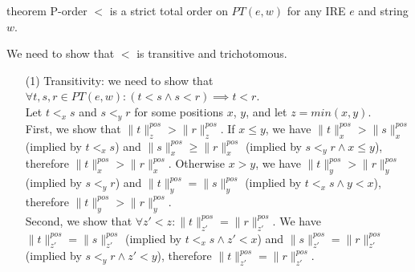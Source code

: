 \documentclass[AMA,STIX1COL]{WileyNJD-v2}
\newcommand{\PT}{PT}
\newcommand{\pnorm}[2]{\|{#1}\|^{pos}_{#2}}
\begin{document}
\begin{theoremEnd}[restate, no link to proof, no link to theorem, category=theorem_porder_on_PTs]{theorem}
    \label{theorem_porder_on_PTs}
    P-order $<$ is a strict total order on $\PT(e, w)$ for any IRE $e$ and string $w$.
\end{theoremEnd}
\begin{proofEnd}
    We need to show that $<$ is transitive and trichotomous.
    \begin{itemize}[itemsep=0.3em, topsep=0.5em]
        \item[(1)]
            Transitivity: we need to show that $\forall t, s, r \in \PT(e, w): (t < s \wedge s < r) \implies t < r$.
            \\[0.5em]
            Let $t <_x s$ and $s <_y r$ for some positions $x$, $y$, and let $z = min (x, y)$.
            \\[0.5em]
            First, we show that $\pnorm{t}{z} > \pnorm{r}{z}$.
            If $x \leq y$, we have $\pnorm{t}{x} > \pnorm{s}{x}$ (implied by $t <_x s$)
            and $\pnorm{s}{x} \geq \pnorm{r}{x}$ (implied by $s <_y r \wedge x \leq y$),
            therefore $\pnorm{t}{x} > \pnorm{r}{x}$.
            Otherwise $x > y$, we have $\pnorm{t}{y} > \pnorm{r}{y}$ (implied by $s <_y r$)
            and $\pnorm{t}{y} = \pnorm{s}{y}$ (implied by $t <_x s \wedge y < x$),
            therefore $\pnorm{t}{y} > \pnorm{r}{y}$.
            \\[0.5em]
            Second, we show that $\forall z' < z : \pnorm{t}{z'} = \pnorm{r}{z'}$.
            We have $\pnorm{t}{z'} = \pnorm{s}{z'}$ (implied by $t <_x s \wedge z' < x$)
            and $\pnorm{s}{z'} = \pnorm{r}{z'}$ (implied by $s <_y r \wedge z' < y$),
            therefore $\pnorm{t}{z'} = \pnorm{r}{z'}$.


\end{itemize}
\end{proofEnd}
\end{document}
